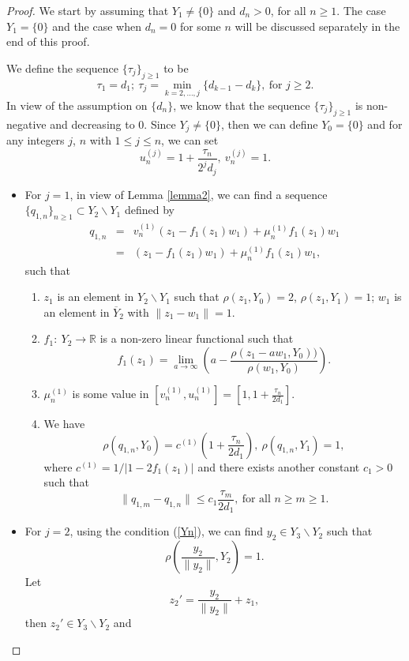 \documentclass[10pt,a4paper]{amsart}
\begin{document}
\begin{proof} We start by assuming that $Y_1 \neq \{0\}$ and  $d_n>0$, for all $n\ge1$. The case $Y_1=\{0\}$ and the case when $d_n=0$ for some $n$ will be discussed separately in the end of this proof.

We define the sequence $\{\tau_j\}_{j\ge1}$ to be
$$
\tau_1=d_1;~\tau_{j}=\min\limits_{k=2,\ldots,j}\{d_{k-1}-d_{k}\},~\mbox{for $j\ge2$}.
$$
In view of the assumption on $\{d_n\}$, we know that the sequence $\{\tau_{j}\}_{j\ge1}$ is non-negative and decreasing to $0$. Since $Y_j\ne \{0\}$, then we can define $Y_0=\{0\}$ and for any integers $j$, $n$ with $1\le j\le n$, we can set
$$
u_n^{(j)}=1+\frac{\tau_n}{2^jd_j},~v_n^{(j)}=1.
$$
\begin{itemize}
\item For $j=1$, in view of Lemma \ref{lemma2}, we can find a sequence $\{q_{1,n}\}_{n\ge 1}\subset Y_{2}\backslash Y_1$ defined by
\begin{eqnarray*}
q_{1,n}&=&v_n^{(1)}(z_1-f_1(z_1)w_1)+\mu_n^{(1)}f_1(z_1)w_1\\
&=&(z_1-f_1(z_1)w_1)+\mu_n^{(1)}f_1(z_1)w_1,
\end{eqnarray*}
such that
\renewcommand{\labelenumi}{\alph{enumi})}
\begin{enumerate}
\item[(i)] $z_1$ is an element in $Y_2\backslash Y_1$ such that $\rho(z_1,Y_0)=2$, $\rho(z_1,Y_1)=1$; $w_1$ is an element in $\overline Y_2$ with $\|z_1-w_1\|=1$.
    \item[(ii)] $f_1:~Y_2\rightarrow \mathbb R$ is a non-zero linear functional such that 
    $$
    f_1(z_1)=\lim\limits_{a\to\infty}\left(a-\frac{\rho(z_1-aw_1,Y_0))}{\rho(w_1,Y_0)}\right).
    $$
    \item[(iii)] $\mu_n^{(1)}$ is some value in $[v_n^{(1)},u_n^{(1)}]=\left[1,1+\frac{\tau_n}{2d_1}\right]$.
    \item[(iv)] We have 
$$
\rho(q_{1,n},Y_{0})=c^{(1)}\left(1+\frac{\tau_n}{2d_1}\right),~\rho(q_{1,n},Y_1)=1,
$$
where $c^{(1)}=1/|1-2f_1(z_1)|$ 
and there exists another constant $c_1>0$ such that
$$
\|q_{1,m}-q_{1,n}\|\le c_1\frac{\tau_m}{2d_1},~\mbox{for all $n\ge m\ge 1$}.
$$
\end{enumerate}
\item For $j=2$, using the condition (\ref{Yn}), we can find $y_2\in Y_3\backslash Y_2$ such that
$$
\rho\left(\frac{y_2}{\|y_2\|},Y_2\right)=1.
$$
Let 
$$
z_2'=\frac{y_2}{\|y_2\|}+z_1,
$$
then $z_2'\in Y_3\backslash Y_2$ and
\begin{equation}

\end{equation}
\end{itemize}
\end{proof}
\end{document}
